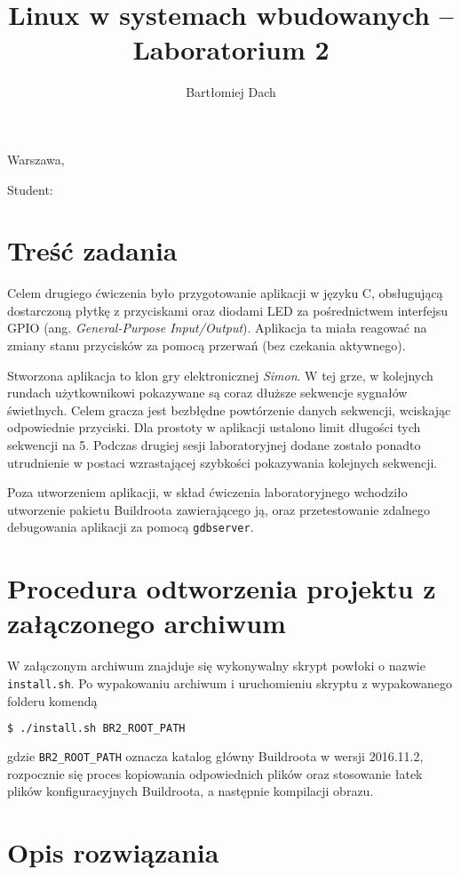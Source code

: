 \documentclass[10pt,a4paper]{article}
\title{Linux w systemach wbudowanych -- Laboratorium 2}
\author{Bartłomiej Dach}
\begin{document}
\makeatletter
\begin{flushright}
	Warszawa, \@date
\end{flushright}
\begin{center}
	\LARGE{\@title}
\end{center}
\vspace{0.25cm}
Student: \@author
\makeatother

\section{Treść zadania}

Celem drugiego ćwiczenia było przygotowanie aplikacji w języku C, obsługującą dostarczoną płytkę z przyciskami oraz diodami LED za pośrednictwem interfejsu GPIO (ang. \emph{General-Purpose Input/Output}). Aplikacja ta miała reagować na zmiany stanu przycisków za pomocą przerwań (bez czekania aktywnego).

Stworzona aplikacja to klon gry elektronicznej \emph{Simon}. W tej grze, w kolejnych rundach użytkownikowi pokazywane są coraz dłuższe sekwencje sygnałów świetlnych. Celem gracza jest bezbłędne powtórzenie danych sekwencji, wciskając odpowiednie przyciski. Dla prostoty w aplikacji ustalono limit długości tych sekwencji na 5. Podczas drugiej sesji laboratoryjnej dodane zostało ponadto utrudnienie w postaci wzrastającej szybkości pokazywania kolejnych sekwencji.

Poza utworzeniem aplikacji, w skład ćwiczenia laboratoryjnego wchodziło utworzenie pakietu Buildroota zawierającego ją, oraz przetestowanie zdalnego debugowania aplikacji za pomocą \verb+gdbserver+.

\section{Procedura odtworzenia projektu z załączonego archiwum}

W załączonym archiwum znajduje się wykonywalny skrypt powłoki o nazwie \verb+install.sh+. Po wypakowaniu archiwum i uruchomieniu skryptu z wypakowanego folderu komendą
\begin{lstlisting}[language=bash]
$ ./install.sh BR2_ROOT_PATH
\end{lstlisting}
gdzie \verb+BR2_ROOT_PATH+ oznacza katalog główny Buildroota w wersji 2016.11.2, rozpocznie się proces kopiowania odpowiednich plików oraz stosowanie łatek plików konfiguracyjnych Buildroota, a następnie kompilacji obrazu.

\section{Opis rozwiązania}
\end{document}
